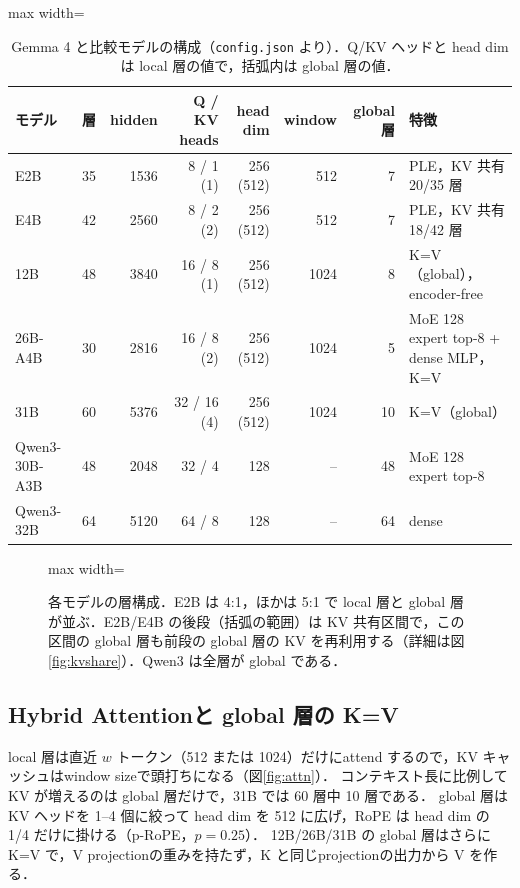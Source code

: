\documentclass[a4paper,10pt]{ltjsarticle}
\begin{document}
\begin{table}[htbp]\centering\small
\caption{Gemma 4 と比較モデルの構成（\texttt{config.json} より）．Q/KV ヘッドと head dim は local 層の値で，括弧内は global 層の値．}
\label{tab:arch}
\begin{adjustbox}{max width=\linewidth}
\begin{tabular}{lrrrrrrl}\toprule
モデル & 層 & hidden & Q / KV heads & head dim & window & global 層 & 特徴 \\\midrule
E2B & 35 & 1536 & 8 / 1 (1) & 256 (512) & 512 & 7 & PLE，KV 共有 20/35 層 \\
E4B & 42 & 2560 & 8 / 2 (2) & 256 (512) & 512 & 7 & PLE，KV 共有 18/42 層 \\
12B & 48 & 3840 & 16 / 8 (1) & 256 (512) & 1024 & 8 & K=V（global），encoder-free \\
26B-A4B & 30 & 2816 & 16 / 8 (2) & 256 (512) & 1024 & 5 & MoE 128 expert top-8 + dense MLP，K=V \\
31B & 60 & 5376 & 32 / 16 (4) & 256 (512) & 1024 & 10 & K=V（global）\\\midrule
Qwen3-30B-A3B & 48 & 2048 & 32 / 4 & 128 & -- & 48 & MoE 128 expert top-8 \\
Qwen3-32B & 64 & 5120 & 64 / 8 & 128 & -- & 64 & dense \\
\bottomrule\end{tabular}
\end{adjustbox}
\end{table}

\begin{figure}[htbp]\centering
\begin{adjustbox}{max width=\linewidth}\end{adjustbox}
\caption{各モデルの層構成．E2B は 4:1，ほかは 5:1 で local 層と global 層が並ぶ．E2B/E4B の後段（括弧の範囲）は KV 共有区間で，この区間の global 層も前段の global 層の KV を再利用する（詳細は図\ref{fig:kvshare}）．Qwen3 は全層が global である．}
\label{fig:layers}
\end{figure}

\subsection{Hybrid Attentionと global 層の K=V}
local 層は直近 $w$ トークン（512 または 1024）だけにattend するので，KV キャッシュはwindow sizeで頭打ちになる（図\ref{fig:attn}）．
コンテキスト長に比例して KV が増えるのは global 層だけで，31B では 60 層中 10 層である．
global 層は KV ヘッドを 1--4 個に絞って head dim を 512 に広げ，RoPE は head dim の 1/4 だけに掛ける（p-RoPE，$p=0.25$）．
12B/26B/31B の global 層はさらに K=V で，V projectionの重みを持たず，K と同じprojectionの出力から V を作る．
\end{document}
